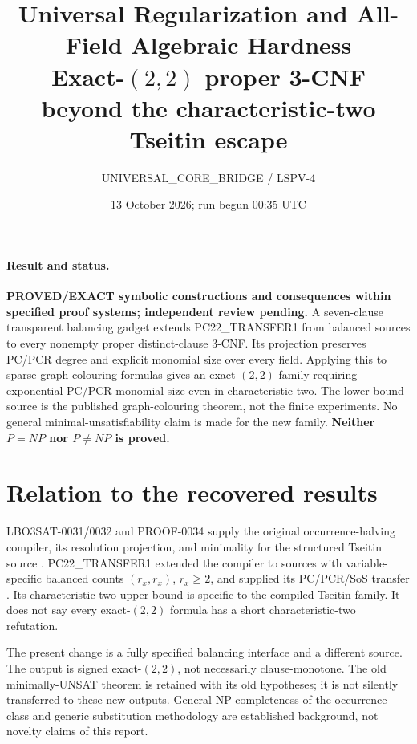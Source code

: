 \documentclass[11pt]{article}
\title{\textbf{Universal Regularization and All-Field Algebraic Hardness}\\[0.3em]
\large Exact-$(2,2)$ proper 3-CNF beyond the characteristic-two Tseitin escape}
\author{UNIVERSAL\_CORE\_BRIDGE / LSPV-4}
\date{13 October 2026; run begun 00:35 UTC}
\begin{document}
\maketitle

\paragraph{Result and status.}
\textbf{PROVED/EXACT symbolic constructions and consequences within specified proof systems;
independent review pending.} A seven-clause transparent balancing gadget extends
PC22\_TRANSFER1 from balanced sources to every nonempty proper distinct-clause
3-CNF. Its projection preserves PC/PCR degree and explicit monomial size over
every field. Applying this to sparse graph-colouring formulas gives an
exact-$(2,2)$ family requiring exponential PC/PCR monomial size even in
characteristic two. The lower-bound source is the published graph-colouring
theorem, not the finite experiments. No general minimal-unsatisfiability claim
is made for the new family. \textbf{Neither $P=NP$ nor $P\ne NP$ is proved.}

\section{Relation to the recovered results}
LBO3SAT-0031/0032 and PROOF-0034 supply the original occurrence-halving compiler,
its resolution projection, and minimality for the structured Tseitin source
\cite{LBO}. PC22\_TRANSFER1 extended the compiler to sources with variable-specific
balanced counts $(r_x,r_x)$, $r_x\ge2$, and supplied its PC/PCR/SoS transfer
\cite{PC22}. Its characteristic-two upper bound is specific to the compiled
Tseitin family. It does not say every exact-$(2,2)$ formula has a short
characteristic-two refutation.

The present change is a fully specified balancing interface and a different
source. The output is signed exact-$(2,2)$, not necessarily clause-monotone.
The old minimally-UNSAT theorem is retained with its old hypotheses; it is not
silently transferred to these new outputs. General NP-completeness of the
occurrence class and generic substitution methodology are established background,
not novelty claims of this report.
\end{document}
